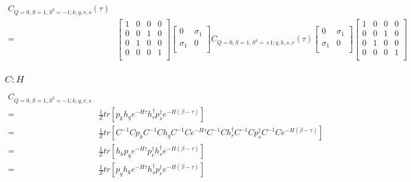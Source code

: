 \begin{equation}
  \begin{aligned}
    C_{Q=0,S=1,S^3=-1;k,q,r,s} (\tau) \\
    =& \left[ {\begin{array}{cccc}
      1 & 0 & 0 & 0 \\
      0 & 0 & 1 & 0 \\
      0 & 1 & 0 & 0 \\
      0 & 0 & 0 & 1 \\
    \end{array} } \right]
    \left[ {\begin{array}{cc}
      0 & \sigma_1 \\
      \sigma_1 & 0 \\
    \end{array} } \right]
    C_{Q=0,S=1,S^3=+1;q,k,s,r} (\tau)
    \left[ {\begin{array}{cc}
      0 & \sigma_1 \\
      \sigma_1 & 0 \\
    \end{array} } \right]
    \left[ {\begin{array}{cccc}
      1 & 0 & 0 & 0 \\
      0 & 0 & 1 & 0 \\
      0 & 1 & 0 & 0 \\
      0 & 0 & 0 & 1 \\
    \end{array} } \right]
  \end{aligned}
\end{equation}

\subsubsection{\underline{$C : H$}}

\begin{equation}
  \begin{aligned}
    C_{Q=0,S=1,S^3=-1;k,q,r,s} \\
    =& \frac{1}{Z}tr\left[p_kh_qe^{-H\tau}h^\dagger_rp^\dagger_se^{-H\left(\beta-\tau\right)}\right] \\
    =& \frac{1}{Z}tr\left[C^{-1}Cp_kC^{-1}Ch_qC^{-1}Ce^{-H\tau}C^{-1}Ch^\dagger_rC^{-1}Cp^\dagger_sC^{-1}Ce^{-H\left(\beta-\tau\right)}\right] \\
    =& \frac{1}{Z}tr\left[h_kp_qe^{-H\tau}p^\dagger_rh^\dagger_se^{-H\left(\beta-\tau\right)}\right] \\
    =& \frac{1}{Z}tr\left[p_qh_ke^{-H\tau}h^\dagger_sp^\dagger_re^{-H\left(\beta-\tau\right)}\right]
  \end{aligned}
\end{equation}

